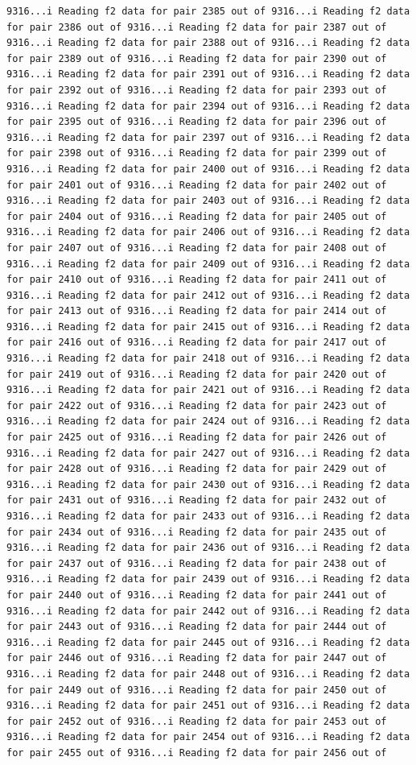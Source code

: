 \documentclass[
]{article}
\begin{document}
\begin{verbatim}
9316...i Reading f2 data for pair 2385 out of 9316...i Reading f2 data for pair 2386 out of 9316...i Reading f2 data for pair 2387 out of 9316...i Reading f2 data for pair 2388 out of 9316...i Reading f2 data for pair 2389 out of 9316...i Reading f2 data for pair 2390 out of 9316...i Reading f2 data for pair 2391 out of 9316...i Reading f2 data for pair 2392 out of 9316...i Reading f2 data for pair 2393 out of 9316...i Reading f2 data for pair 2394 out of 9316...i Reading f2 data for pair 2395 out of 9316...i Reading f2 data for pair 2396 out of 9316...i Reading f2 data for pair 2397 out of 9316...i Reading f2 data for pair 2398 out of 9316...i Reading f2 data for pair 2399 out of 9316...i Reading f2 data for pair 2400 out of 9316...i Reading f2 data for pair 2401 out of 9316...i Reading f2 data for pair 2402 out of 9316...i Reading f2 data for pair 2403 out of 9316...i Reading f2 data for pair 2404 out of 9316...i Reading f2 data for pair 2405 out of 9316...i Reading f2 data for pair 2406 out of 9316...i Reading f2 data for pair 2407 out of 9316...i Reading f2 data for pair 2408 out of 9316...i Reading f2 data for pair 2409 out of 9316...i Reading f2 data for pair 2410 out of 9316...i Reading f2 data for pair 2411 out of 9316...i Reading f2 data for pair 2412 out of 9316...i Reading f2 data for pair 2413 out of 9316...i Reading f2 data for pair 2414 out of 9316...i Reading f2 data for pair 2415 out of 9316...i Reading f2 data for pair 2416 out of 9316...i Reading f2 data for pair 2417 out of 9316...i Reading f2 data for pair 2418 out of 9316...i Reading f2 data for pair 2419 out of 9316...i Reading f2 data for pair 2420 out of 9316...i Reading f2 data for pair 2421 out of 9316...i Reading f2 data for pair 2422 out of 9316...i Reading f2 data for pair 2423 out of 9316...i Reading f2 data for pair 2424 out of 9316...i Reading f2 data for pair 2425 out of 9316...i Reading f2 data for pair 2426 out of 9316...i Reading f2 data for pair 2427 out of 9316...i Reading f2 data for pair 2428 out of 9316...i Reading f2 data for pair 2429 out of 9316...i Reading f2 data for pair 2430 out of 9316...i Reading f2 data for pair 2431 out of 9316...i Reading f2 data for pair 2432 out of 9316...i Reading f2 data for pair 2433 out of 9316...i Reading f2 data for pair 2434 out of 9316...i Reading f2 data for pair 2435 out of 9316...i Reading f2 data for pair 2436 out of 9316...i Reading f2 data for pair 2437 out of 9316...i Reading f2 data for pair 2438 out of 9316...i Reading f2 data for pair 2439 out of 9316...i Reading f2 data for pair 2440 out of 9316...i Reading f2 data for pair 2441 out of 9316...i Reading f2 data for pair 2442 out of 9316...i Reading f2 data for pair 2443 out of 9316...i Reading f2 data for pair 2444 out of 9316...i Reading f2 data for pair 2445 out of 9316...i Reading f2 data for pair 2446 out of 9316...i Reading f2 data for pair 2447 out of 9316...i Reading f2 data for pair 2448 out of 9316...i Reading f2 data for pair 2449 out of 9316...i Reading f2 data for pair 2450 out of 9316...i Reading f2 data for pair 2451 out of 9316...i Reading f2 data for pair 2452 out of 9316...i Reading f2 data for pair 2453 out of 9316...i Reading f2 data for pair 2454 out of 9316...i Reading f2 data for pair 2455 out of 9316...i Reading f2 data for pair 2456 out of 
\end{verbatim}
\end{document}
